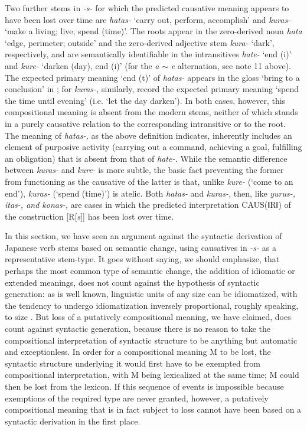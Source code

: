 \documentclass[output=paper,
modfonts
]{LSP/langsci}
\begin{document}
Two further stems in \textit{-s-} for which the predicted causative
meaning appears to have been lost over time are \textit{hatas-} `carry
out, perform, accomplish' and \textit{kuras-} `make a living; live, spend
(time)'. The roots appear in the zero-derived noun \textit{hata} `edge,
perimeter; outside' and the zero-derived adjective stem \textit{kura-}
`dark', respectively, and are semantically identifiable in the
intransitives \textit{hate-} `end (i)' and \textit{kure-} `darken (day), end
(i)' (for the \textit{a} $\sim$ \textit{e} alternation, see note 11 above). The
expected primary meaning `end (t)' of \textit{hatas-} appears in the gloss
`bring to a conclusion' in \citet{omodaka1967a}; for \textit{kuras-,}
similarly, \citeauthor{omodaka1967a} record the expected primary meaning `spend the
time until evening' (i.e. `let the day darken'). In both cases, however,
this compositional meaning is absent from the modern stems, neither of
which stands in a purely causative relation to the corresponding
intransitive or to the root. The meaning of \textit{hatas-,} as the above
definition indicates, inherently includes an element of purposive
activity (carrying out a command, achieving a goal, fulfilling an
obligation) that is absent from that of \textit{hate-.} While the semantic
difference between \textit{kuras-} and \textit{kure-} is more subtle, the
basic fact preventing the former from functioning as the causative of
the latter is that, unlike \textit{kure-} (`come to an end'),
\textit{kuras-} (`spend (time)') is atelic. Both \textit{hatas-} and
\textit{kuras-,} then, like \textit{yurus-, itas-, and konas-,} are cases in
which the predicted interpretation CAUS(ǁRǁ) of the construction
{[}R{[}\textit{s}{]}{]} has been lost over time.

In this section, we have seen an argument against the syntactic
derivation of Japanese verb stems based on semantic change, using
causatives in \textit{-s-} as a representative stem-type. It goes without
saying, we should emphasize, that perhaps the most common type of
semantic change, the addition of idiomatic or extended meanings, does
not count against the hypothesis of syntactic generation: as is well
known, linguistic units of any size can be idiomatized, with the
tendency to undergo idiomatization inversely proportional, roughly
speaking, to size \citep[14]{sciullo1987a}. But loss of a
putatively compositional meaning, we have claimed, does count against
syntactic generation, because there is no reason to take the
compositional interpretation of syntactic structure to be anything but
automatic and exceptionless. In order for a compositional meaning M to
be lost, the syntactic structure underlying it would first have to be
exempted from compositional interpretation, with M being lexicalized at
the same time; M could then be lost from the lexicon. If this sequence
of events is impossible because exemptions of the required type are
never granted, however, a putatively compositional meaning that is in
fact subject to loss cannot have been based on a syntactic derivation in
the first place.
\end{document}
